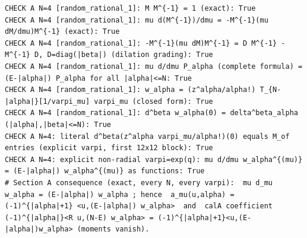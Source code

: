 \documentclass{article}
\theoremstyle{remark}
\begin{document}
\begin{lstlisting}
CHECK A N=4 [random_rational_1]: M M^{-1} = 1 (exact): True
CHECK A N=4 [random_rational_1]: mu d(M^{-1})/dmu = -M^{-1}(mu dM/dmu)M^{-1} (exact): True
CHECK A N=4 [random_rational_1]: -M^{-1}(mu dM)M^{-1} = D M^{-1} - M^{-1} D, D=diag(|beta|) (dilation grading): True
CHECK A N=4 [random_rational_1]: mu d/dmu P_alpha (complete formula) = (E-|alpha|) P_alpha for all |alpha|<=N: True
CHECK A N=4 [random_rational_1]: w_alpha = (z^alpha/alpha!) T_{N-|alpha|}[1/varpi_mu] varpi_mu (closed form): True
CHECK A N=4 [random_rational_1]: d^beta w_alpha(0) = delta^beta_alpha (|alpha|,|beta|<=N): True
CHECK A N=4: literal d^beta(z^alpha varpi_mu/alpha!)(0) equals M_of entries (explicit varpi, first 12x12 block): True
CHECK A N=4: explicit non-radial varpi=exp(q): mu d/dmu w_alpha^{(mu)} = (E-|alpha|) w_alpha^{(mu)} as functions: True
# Section A consequence (exact, every N, every varpi):  mu d_mu w_alpha = (E-|alpha|) w_alpha ; hence  a_mu(u,alpha) = (-1)^{|alpha|+1} <u,(E-|alpha|) w_alpha>  and  calA coefficient (-1)^{|alpha|}<R u,(N-E) w_alpha> = (-1)^{|alpha|+1}<u,(E-|alpha|)w_alpha> (moments vanish).


\end{lstlisting}
\end{document}
